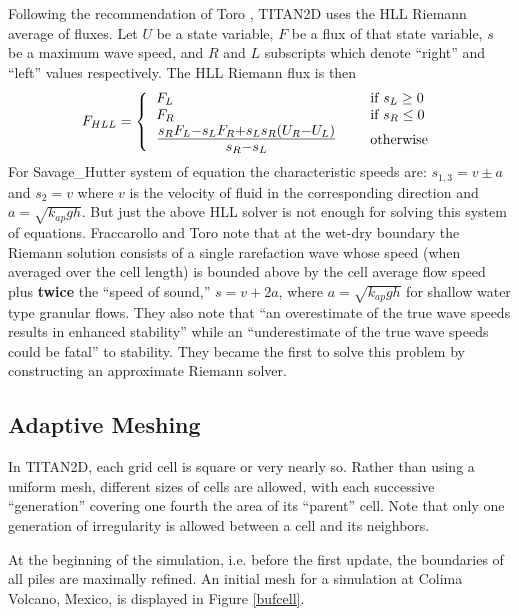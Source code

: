 \documentclass[letterpaper,10pt]{article}
\begin{document}
Following the recommendation of Toro \cite{ToroBook2001}, TITAN2D uses 
the HLL Riemann average of fluxes. Let $U$ be a state variable, $F$ 
be a flux of that state variable, $s$ be a maximum wave speed, 
and $R$ and $L$ subscripts which denote ``right'' and ``left'' values 
respectively.  The HLL Riemann flux is then
\begin{equation}
	F_{HLL}=\left\{
		\begin{tabular}{lll}
			$F_L$&\hspace{0.5 truein}& if $s_L\ge 0$\\
			$F_R$&& if $s_R\le 0$\\
			{\Large $\frac{s_RF_L-s_LF_R+s_Ls_R(U_R-U_L)}{s_R-s_L}$}&& otherwise
		\end{tabular} 
	\right.
\end{equation}
For Savage\_Hutter system of equation the characteristic speeds are: $s_{1,3}=v\pm a$ and $s_2=v$ where $v$ is the 
velocity of fluid in the corresponding direction and $a=\sqrt{k_{ap}gh}$.
But just the above HLL solver is not enough for solving this system of equations.
Fraccarollo and Toro \cite{FraccarolloToro1995} note that at the 
wet-dry boundary the Riemann solution consists of a single rarefaction 
wave whose speed (when averaged over the cell length) 
is bounded above by the cell average flow speed plus 
{\bf twice} the ``speed of sound,'' $s=v+2a$, where $a=\sqrt{k_{ap}gh}$ 
for shallow water type granular flows.  They also note that ``an overestimate 
of the true wave speeds results in enhanced stability'' while an 
``underestimate of the true wave speeds could be fatal'' to stability.
They became the first to 
solve this problem by constructing an approximate Riemann solver.\newline

\subsection{Adaptive Meshing} \label{adaptivemeshing}
In   TITAN2D, each grid cell is square or very nearly so.  Rather than 
using a uniform mesh, different sizes of cells are allowed, with each 
successive ``generation'' covering one fourth the area of its ``parent'' 
cell.  Note that only one generation of irregularity is allowed between 
a cell and its neighbors.\newline

At the beginning of the simulation, i.e. before the first update, the 
boundaries of all piles are maximally refined. An initial mesh for a 
simulation at Colima Volcano, Mexico, is displayed in Figure \ref{bufcell}. 
\end{document}
